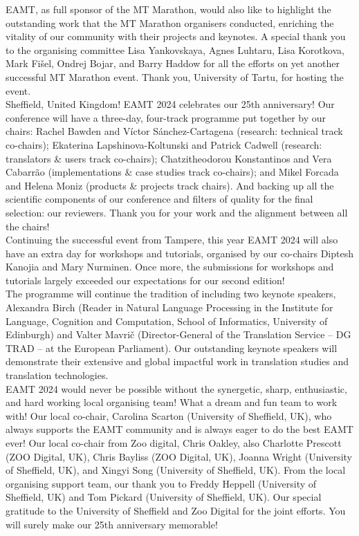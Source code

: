 EAMT, as full sponsor of the MT Marathon, would also like to highlight the outstanding work that the MT Marathon organisers conducted, enriching the vitality of our community with their projects and keynotes. A special thank you to the organising committee Lisa Yankovskaya, Agnes Luhtaru, Lisa Korotkova, Mark Fišel, Ondrej Bojar, and Barry Haddow for all the efforts on yet another successful MT Marathon event. Thank you, University of Tartu, for hosting the event.
\\

Sheffield, United Kingdom! EAMT 2024 celebrates our 25th anniversary! Our conference will have a three-day, four-track programme put together by our chairs: Rachel Bawden and Víctor Sánchez-Cartagena (research: technical track co-chairs); Ekaterina Lapshinova-Koltunski and Patrick Cadwell (research: translators \& users track co-chairs); Chatzitheodorou Konstantinos and Vera Cabarrão (implementations \& case studies track co-chairs); and Mikel Forcada and Helena Moniz (products \& projects track chairs). And backing up all the scientific components of our conference and filters of quality for the final selection: our reviewers. Thank you for your work and the alignment between all the chairs!
\\

Continuing the successful event from Tampere, this year EAMT 2024 will also have an extra day for workshops and tutorials, organised by our co-chairs Diptesh Kanojia and Mary Nurminen. Once more, the submissions for workshops and tutorials largely exceeded our expectations for our second edition!
\\

The programme will continue the tradition of including two keynote speakers, Alexandra Birch (Reader in Natural Language Processing in the Institute for Language, Cognition and Computation, School of Informatics, University of Edinburgh) and Valter Mavrič (Director-General of the Translation Service – DG TRAD – at the European Parliament). Our outstanding keynote speakers will demonstrate their extensive and global impactful work in translation studies and translation technologies.
\\

EAMT 2024 would never be possible without the synergetic, sharp, enthusiastic, and hard working local organising team! What a dream and fun team to work with! Our local co-chair, Carolina Scarton (University of Sheffield, UK), who always supports the EAMT community and is always eager to do the best EAMT ever! Our local co-chair from Zoo digital, Chris Oakley, also Charlotte Prescott (ZOO Digital, UK), Chris Bayliss (ZOO Digital, UK), Joanna Wright (University of Sheffield, UK), and Xingyi Song (University of Sheffield, UK). From the local organising support team, our thank you to Freddy Heppell (University of Sheffield, UK) and Tom Pickard (University of Sheffield, UK). Our special gratitude to the University of Sheffield and Zoo Digital for the joint efforts. You will surely make our 25th anniversary memorable!
\\

